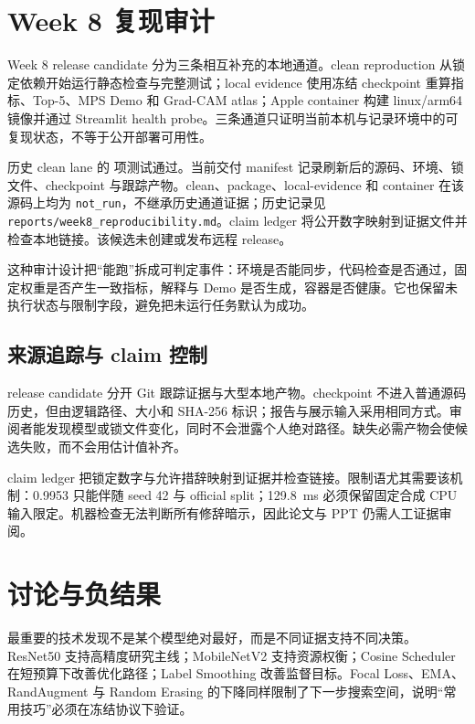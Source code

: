 \documentclass[UTF8,11pt]{ctexart}
\begin{document}
\section{Week 8 复现审计}

Week 8 release candidate 分为三条相互补充的本地通道。clean reproduction 从锁定依赖开始运行静态检查与完整测试；local evidence 使用冻结 checkpoint 重算指标、Top-5、MPS Demo 和 Grad-CAM atlas；Apple container 构建 linux/arm64 镜像并通过 Streamlit health probe。三条通道只证明当前本机与记录环境中的可复现状态，不等于公开部署可用性。



历史 clean lane 的 \PDAWeekEightCleanTests 项测试通过。当前交付 manifest 记录刷新后的源码、环境、锁文件、checkpoint 与跟踪产物。clean、package、local-evidence 和 container 在该源码上均为 \texttt{not\_run}，不继承历史通道证据；历史记录见 \texttt{reports/week8\_reproducibility.md}。claim ledger 将公开数字映射到证据文件并检查本地链接。该候选未创建或发布远程 release。

这种审计设计把“能跑”拆成可判定事件：环境是否能同步，代码检查是否通过，固定权重是否产生一致指标，解释与 Demo 是否生成，容器是否健康。它也保留未执行状态与限制字段，避免把未运行任务默认为成功。

\subsection*{来源追踪与 claim 控制}

release candidate 分开 Git 跟踪证据与大型本地产物。checkpoint 不进入普通源码历史，但由逻辑路径、大小和 SHA-256 标识；报告与展示输入采用相同方式。审阅者能发现模型或锁文件变化，同时不会泄露个人绝对路径。缺失必需产物会使候选失败，而不会用估计值补齐。

claim ledger 把锁定数字与允许措辞映射到证据并检查链接。限制语尤其需要该机制：0.9953 只能伴随 seed 42 与 official split；129.8~ms 必须保留固定合成 CPU 输入限定。机器检查无法判断所有修辞暗示，因此论文与 PPT 仍需人工证据审阅。

\section{讨论与负结果}

最重要的技术发现不是某个模型绝对最好，而是不同证据支持不同决策。ResNet50 支持高精度研究主线；MobileNetV2 支持资源权衡；Cosine Scheduler 在短预算下改善优化路径；Label Smoothing 改善监督目标。Focal Loss、EMA、RandAugment 与 Random Erasing 的下降同样限制了下一步搜索空间，说明“常用技巧”必须在冻结协议下验证。
\end{document}
